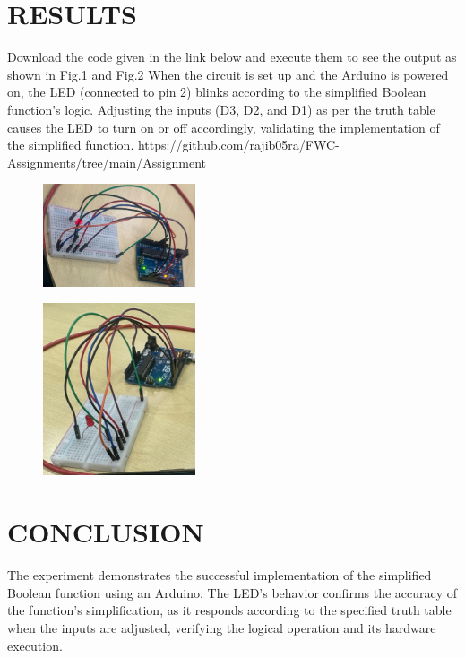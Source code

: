 \documentclass[conference]{IEEEtran}
\begin{document}
\section{RESULTS}
Download the code given in the link below and execute them to see the output as shown in Fig.1 and Fig.2 When the circuit is set up and the Arduino is powered on, the LED (connected to pin 2) blinks according to the simplified Boolean function’s logic. Adjusting the inputs (D3, D2, and D1) as per the truth table causes the LED to turn on or off accordingly, validating the implementation of the simplified function.
https://github.com/rajib05ra/FWC-Assignments/tree/main/Assignment%
\begin{figure}[h] 
 \centering 
 \includegraphics[width=0.4\textwidth]{IMG-20241022-WA0001.jpg}
 \caption{\label{fig:1}}    
\end{figure}
\begin{figure}[h] 
 \centering 
 \includegraphics[width=0.4\textwidth]{IMG-20241022-WA0002}
 \caption{\label{fig:2}}    
\end{figure}
\section{CONCLUSION}
The experiment demonstrates the successful implementation of the simplified Boolean function using an Arduino. The LED’s behavior confirms the accuracy of the function's simplification, as it responds according to the specified truth table when the inputs are adjusted, verifying the logical operation and its hardware execution.
\end{document}
